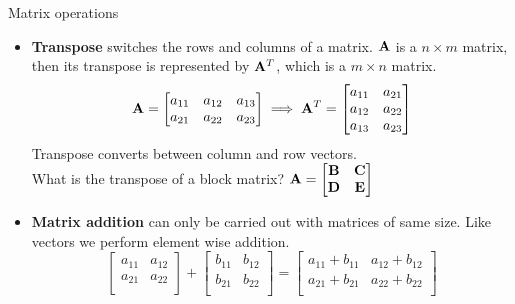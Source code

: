 \documentclass[aspectratio=169]{beamer}
\def\mf{\ensuremath\mathbf}
\begin{document}
\begin{frame}[t]{Matrix operations}
\begin{itemize}
\item \textbf{Transpose} switches the rows and columns of a matrix. $\mf{A}$ is a $n\times m$ matrix, then its transpose is represented by $\mf{A}^T$, which is a $m \times n$ matrix.
\[ \mf{A} = \begin{bmatrix}
a_{11} & a_{12} & a_{13}\\
a_{21} & a_{22} & a_{23}\\
\end{bmatrix} \implies \mf{A}^T = \begin{bmatrix}
a_{11} & a_{21}\\
a_{12} & a_{22}\\
a_{13} & a_{23}\\
\end{bmatrix} \]
Transpose converts between column and row vectors.\\
What is the transpose of a block matrix? $\mf{A} = \begin{bmatrix}
\mf{B} & \mf{C}\\\mf{D} & \mf{E}
\end{bmatrix}$
\item \textbf{Matrix addition} can only be carried out with matrices of same size. Like vectors we perform element wise addition.
\[ \begin{bmatrix}
a_{11} & a_{12}\\
a_{21} & a_{22}\\
\end{bmatrix} + \begin{bmatrix}
b_{11} & b_{12}\\
b_{21} & b_{22}\\
\end{bmatrix} = \begin{bmatrix}
a_{11} + b_{11} & a_{12} + b_{12}\\
a_{21} + b_{21} & a_{22} + b_{22}\\
\end{bmatrix}\]
\end{itemize}
\end{frame}
\end{document}
